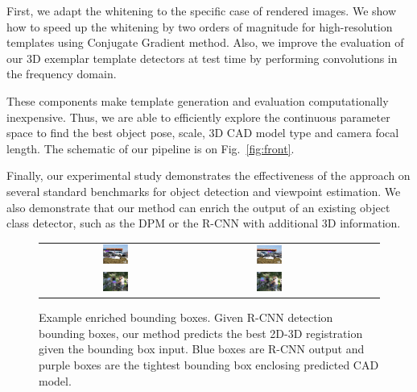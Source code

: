 \documentclass[extendedabs]{bmvc2k}
\begin{document}
First, we adapt the whitening to the specific case of rendered images. We show
how to speed up the whitening by two orders of magnitude for high-resolution
templates using Conjugate Gradient method. Also, we improve the evaluation of
our 3D exemplar template detectors at test time by performing convolutions in
the frequency domain.

These components make template generation and evaluation computationally
inexpensive. Thus, we are able to efficiently explore the continuous parameter
space to find the best object pose, scale, 3D CAD model type and camera focal
length. The schematic of our pipeline is on Fig.~\ref{fig:front}.

Finally, our experimental study demonstrates the effectiveness of the
approach on several standard benchmarks for object detection and viewpoint
estimation. We also demonstrate that our method can enrich the output of an
existing object class detector, such as the DPM or the R-CNN with additional 3D
information.

\begin{figure}[t]
\small
\setlength\tabcolsep{1pt}
\centering
\begin{tabular}{ccccc}
  \includegraphics[width=0.18\textwidth]{car_cnn/2c.png} &
  \includegraphics[width=0.18\textwidth]{car_cnn/2e.png} \\
  \includegraphics[width=0.18\textwidth]{bicycle_cnn/4b.png} &
  \includegraphics[width=0.18\textwidth]{bicycle_cnn/4c.png} \\
\end{tabular}
\caption{Example enriched bounding boxes. Given R-CNN
	detection bounding boxes, our method predicts the best 2D-3D
	registration given the bounding box input. Blue boxes are R-CNN output and
	purple boxes are the tightest bounding box enclosing predicted CAD model.}
\label{fig:pascal12cnn}
\end{figure}
\end{document}
